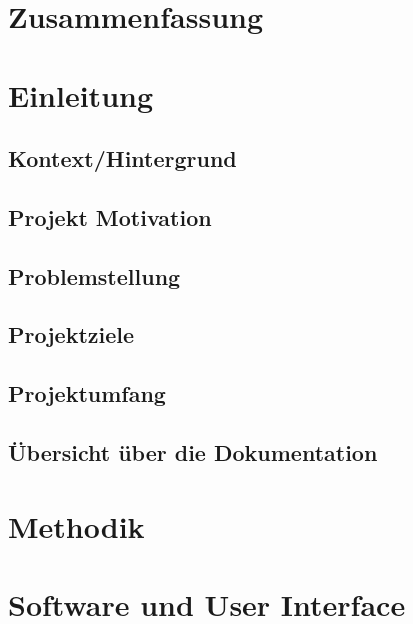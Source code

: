 
\section{Zusammenfassung}
\label{sec:zusammenfassung}



\section{Einleitung}
\label{sec:einleitung}



\subsection{Kontext/Hintergrund}


\subsection{Projekt Motivation}


\subsection{Problemstellung}


\subsection{Projektziele}


\subsection{Projektumfang}


\subsection{Übersicht über die Dokumentation}


\section{Methodik}
\label{sec:methodik}



\section{Software und User Interface}
\label{sec:software_und_user_interface}


